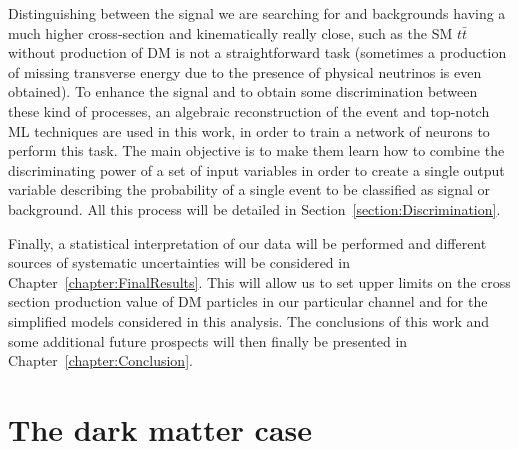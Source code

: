 \documentclass[a4paper, 10pt, openright]{report}
\begin{document}
Distinguishing between the signal we are searching for and backgrounds having a much higher cross-section and kinematically really close, such as the \ac{SM} $t \bar t$ without production of \ac{DM} is not a straightforward task (sometimes a production of missing transverse energy due to the presence of physical neutrinos is even obtained). To enhance the signal and to obtain some discrimination between these kind of processes, an algebraic reconstruction of the event and top-notch \ac{ML} techniques are used in this work, in order to train a network of neurons to perform this task. The main objective is to make them learn how to combine the discriminating power of a set of input variables in order to create a single output variable describing the probability of a single event to be classified as signal or background. All this process will be detailed in Section~\ref{section:Discrimination}.

Finally, a statistical interpretation of our data will be performed and different sources of systematic uncertainties will be considered in Chapter~\ref{chapter:FinalResults}. This will allow us to set upper limits on the cross section production value of \ac{DM} particles in our particular channel and for the simplified models considered in this analysis. The conclusions of this work and some additional future prospects will then finally be presented in Chapter~\ref{chapter:Conclusion}.


\clearpage
\thispagestyle{empty}
\phantom{a}
\vfill
\newpage




































\chapter{The dark matter case}\label{chapter:Case}
\end{document}
